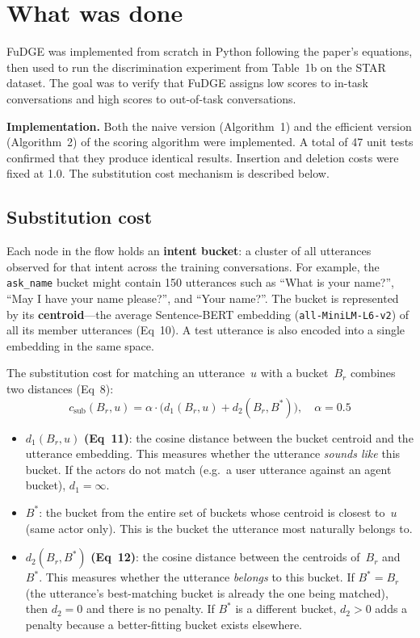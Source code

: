 \documentclass[11pt,a4paper]{article}
\begin{document}
\section{What was done}

FuDGE was implemented from scratch in Python following the paper's equations, then used to run the discrimination experiment from Table~1b on the STAR dataset. The goal was to verify that FuDGE assigns low scores to in-task conversations and high scores to out-of-task conversations.

\textbf{Implementation.} Both the naive version (Algorithm~1) and the efficient version (Algorithm~2) of the scoring algorithm were implemented. A total of 47 unit tests confirmed that they produce identical results. Insertion and deletion costs were fixed at 1.0. The substitution cost mechanism is described below.

\subsection{Substitution cost}

Each node in the flow holds an \textbf{intent bucket}: a cluster of all utterances observed for that intent across the training conversations. For example, the \texttt{ask\_name} bucket might contain 150 utterances such as ``What is your name?'', ``May I have your name please?'', and ``Your name?''. The bucket is represented by its \textbf{centroid}---the average Sentence-BERT embedding (\texttt{all-MiniLM-L6-v2}) of all its member utterances (Eq~10). A test utterance is also encoded into a single embedding in the same space.

The substitution cost for matching an utterance~$u$ with a bucket~$B_r$ combines two distances (Eq~8):
\[
    c_{\text{sub}}(B_r, u) = \alpha \cdot \bigl(d_1(B_r, u) + d_2(B_r, B^*)\bigr), \quad \alpha = 0.5
\]

\begin{itemize}
    \item $d_1(B_r, u)$ \textbf{(Eq~11)}: the cosine distance between the bucket centroid and the utterance embedding. This measures whether the utterance \emph{sounds like} this bucket. If the actors do not match (e.g.\ a user utterance against an agent bucket), $d_1 = \infty$.
    \item $B^*$: the bucket from the entire set of buckets whose centroid is closest to~$u$ (same actor only). This is the bucket the utterance most naturally belongs to.
    \item $d_2(B_r, B^*)$ \textbf{(Eq~12)}: the cosine distance between the centroids of~$B_r$ and~$B^*$. This measures whether the utterance \emph{belongs} to this bucket. If $B^* = B_r$ (the utterance's best-matching bucket is already the one being matched), then $d_2 = 0$ and there is no penalty. If $B^*$ is a different bucket, $d_2 > 0$ adds a penalty because a better-fitting bucket exists elsewhere.
\end{itemize}
\end{document}
